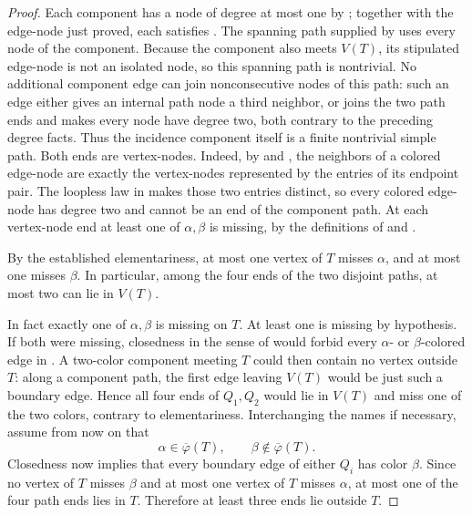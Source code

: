 \begin{proof}
Each component has a node of degree at most one by
; together with the edge-node just proved,
each satisfies .  The spanning path supplied by
 uses every node of the component.
Because the component also meets $V(T)$, its stipulated edge-node is not an
isolated node, so this spanning path is nontrivial.
No additional component edge can join nonconsecutive nodes of this path:
such an edge either gives an internal path node a third neighbor, or joins
the two path ends and makes every node have degree two, both contrary to
the preceding degree facts.  Thus the incidence component itself is a
finite nontrivial simple path.
Both ends are vertex-nodes.  Indeed, by  and
, the neighbors of a colored edge-node are
exactly the vertex-nodes represented by the entries of its endpoint pair.
The loopless law in  makes those two entries
distinct, so every colored edge-node has degree two and cannot be an end of
the component path.  At each vertex-node end at least one of
$\alpha,\beta$ is missing, by the definitions of
 and .

By the established elementariness, at
most one vertex of $T$ misses $\alpha$, and at most one misses $\beta$.
In particular, among the four ends of the two disjoint paths, at most two
can lie in $V(T)$.

In fact exactly one of $\alpha,\beta$ is missing on $T$.  At least one is
missing by hypothesis.  If both were missing, closedness in the sense of
 would forbid every $\alpha$- or
$\beta$-colored edge in .  A two-color component meeting $T$ could
then contain no vertex outside $T$: along a component path, the first edge
leaving $V(T)$ would be just such a boundary edge.  Hence all four ends of
$Q_1,Q_2$ would lie in $V(T)$ and miss one of the two colors, contrary to
elementariness.  Interchanging the names if necessary, assume from now on
that
\[
 \alpha\in\overline\varphi(T),\qquad
 \beta\notin\overline\varphi(T).
\]
Closedness now implies that every boundary edge of either $Q_i$ has color
$\beta$.  Since no vertex of $T$ misses $\beta$ and at most one vertex of
$T$ misses $\alpha$, at most one of the four path ends lies in $T$.
Therefore at least three ends lie outside $T$.


\end{proof}
